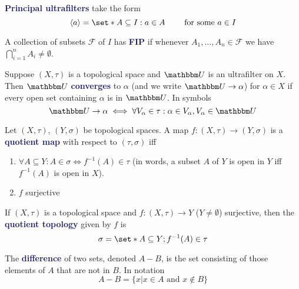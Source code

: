 \documentclass[11pt]{article}
\numberwithin{equation}{section}
\newcommand{\navy}[1]{\textcolor{MidnightBlue}{\bf #1}}
\theoremstyle{definition}
\theoremstyle{definition}
\newcommand\angles[1]{\left\langle #1 \right\rangle}
\newcommand\inv[1]{#1^{-1}}
\def\Set{\set*}%
\def\sse{\subseteq}
\newcommand{\1}{\mathbbm 1}
\def\t{\tau}
\newcommand{\UU}{\mathbbm U}
\newcommand{\fF}{\mathcal F}
\begin{document}
\begin{definition}
\navy{Principal ultrafilters} take the form
\begin{equation}
\angles{a} = \Set{A \sse I: a \in A} \qquad \text{ for some } a \in I
\end{equation}
\end{definition}

\begin{definition}
A collection of subsets $\fF$ of $I$ has \navy{FIP} if whenever $A_1,\ldots,A_n \in \fF$ we have $\bigcap_{i=1}^n A_i \neq \emptyset$.
\end{definition}

\begin{definition}
Suppose $(X,\t)$ is a topological space and $\UU$ is an ultrafilter on $X$. Then $\UU$ \navy{converges} to $\alpha$ (and we write $\UU \to \alpha$) for $\alpha \in X$ if every open set containing $\alpha$ is in $\UU$. In symbols
\begin{equation}
\UU \to \alpha \iff \forall V_\alpha \in \t : \alpha \in V_\alpha, V_\alpha \in \UU
\end{equation}
\end{definition}

\begin{definition}
Let $(X,\t)$, $(Y,\sigma)$ be topological spaces. A map $f: (X,\t) \to (Y,\sigma)$ is a \navy{quotient map} with respect to $(\t,\sigma)$ iff
\begin{enumerate}
\item $\forall A \sse Y: A \in \sigma \iff \inv{f}(A) \in \t$ (in words, a subset $A$ of $Y$ is open in $Y$ iff $\inv{f}(A)$ is open in $X$).
\item $f$ surjective
\end{enumerate}
\end{definition}

\begin{definition}
If $(X,\t)$ is a topological space and $f:(X,\t) \to Y$ ($Y \neq \emptyset$) surjective, then the \navy{quotient topology} given by $f$ is
\begin{equation}
\sigma = \Set{A \sse Y; \inv{f}(A) \in \t}
\end{equation}
\end{definition}

\begin{definition}[Difference]
The \navy{difference} of two sets, denoted $A-B$, is the set consisting of those elements of $A$ that are not in $B$. In notation
\begin{equation*}
A - B = \{x | x \in A \text{ and } x \not\in B\}
\end{equation*}
\end{definition}
\end{document}
